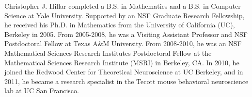 \documentclass[journal, onecolumn]{IEEEtran}
\begin{document}
\begin{IEEEbiographynophoto}{Christopher J. Hillar}
completed a B.S. in Mathematics and a B.S. in Computer Science at Yale University.  Supported by an NSF Graduate Research Fellowship, he received his Ph.D. in Mathematics from the University of California (UC), Berkeley in 2005. From 2005-2008, he was a Visiting Assistant Professor and NSF Postdoctoral Fellow at Texas A\&M University. From 2008-2010, he was an NSF Mathematical Sciences Research Institutes Postdoctoral Fellow at the Mathematical Sciences Research Institute (MSRI) in Berkeley, CA.  In 2010, he joined the Redwood Center for Theoretical Neuroscience at UC Berkeley, and in 2011, he  became a research specialist in the Tecott mouse behavioral neuroscience lab at UC San Francisco.
\end{IEEEbiographynophoto}

\end{document}
